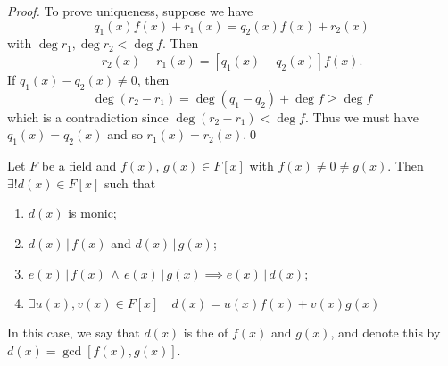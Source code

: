 \begin{proof}
  To prove uniqueness, suppose we have
  \begin{equation*}
    q_1(x) f(x) + r_1(x) = q_2(x) f(x) + r_2(x)
  \end{equation*}
  with $\deg r_1, \deg r_2 < \deg f$. Then
  \begin{equation*}
    r_2(x) - r_1(x) = [ q_1(x) - q_2(x) ] f(x).
  \end{equation*}
  If $q_1(x) - q_2(x) \neq 0$, then
  \begin{equation*}
    \deg (r_2 - r_1) = \deg (q_1 - q_2) + \deg f \geq \deg f
  \end{equation*}
  which is a contradiction since $\deg (r_2 - r_1) < \deg f$. Thus we must have $q_1(x) = q_2(x)$ and so $r_1 (x) = r_2(x)$.\qed
\end{proof}

\begin{propo}
\label{propo:properties_of_the_greatest_common_divisor}
Let $F$ be a field and $f(x), \, g(x) \in F[x]$ with $f(x) \neq 0 \neq g(x)$. Then $\exists ! d(x) \in F[x]$ such that
\begin{enumerate}
  \item $d(x)$ is monic;
  \item $d(x) \, | \, f(x)$ and $d(x) \, | \, g(x)$;
  \item $e(x) \, | \, f(x) \, \land \, e(x) \, | \, g(x) \implies e(x) \, | \, d(x)$;
  \item $\exists u(x), v(x) \in F[x] \quad d(x) = u(x) f(x) + v(x) g(x)$
\end{enumerate}
In this case, we say that $d(x)$ is the  of $f(x)$ and $g(x)$, and denote this by $d(x) = \gcd[ f(x), g(x) ]$.
\end{propo}

